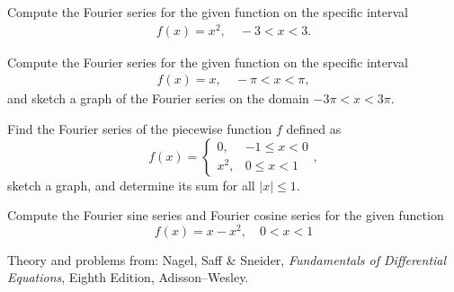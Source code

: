 \documentclass[11pt]{article}
\begin{document}
\makelabtitle



\begin{problem}
Compute the Fourier series for the given function on the specific interval
\begin{eqnarray*}
f(x) = x^2 , \quad -3<x<3.
\end{eqnarray*}
\end{problem}


\begin{problem}
Compute the Fourier series for the given function on the specific interval
\begin{eqnarray*}
f(x) = x , \quad -\pi<x<\pi,
\end{eqnarray*}
and sketch a graph of the Fourier series on the domain $-3\pi<x<3\pi$.
\end{problem}

\begin{problem}
Find the Fourier series of the piecewise function $f$ defined as
\begin{equation*}
f(x) = \left\{ \begin{array}{lr} 0, & -1 \leq x < 0 \\ x^{2}, & 0 \leq x < 1 \end{array} \right.,
\end{equation*}
sketch a graph, and determine its sum for all $|x|\leq 1$.
\end{problem}

\begin{problem}
Compute the Fourier sine series and Fourier cosine series for the given function
\begin{equation*}
f(x) = x-x^2, \quad 0<x<1
\end{equation*}
\end{problem}





\LabSolutions


Theory and problems from: Nagel, Saff \& Sneider, \textit{Fundamentals of Differential Equations}, Eighth Edition, Adisson--Wesley.
\end{document}
